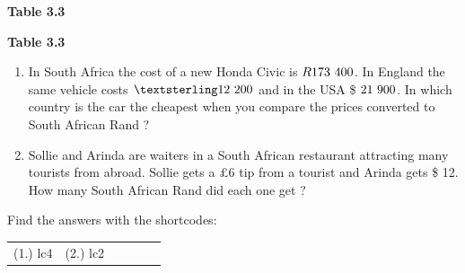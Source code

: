 \begin{enumerate}[noitemsep, label=\textbf{\arabic*}. ]
\begin{table}
\begin{center}
      \end{center}
    \begin{center}{\small\bfseries Table 3.3}\end{center}
    \begin{caption}{\small\bfseries Table 3.3}\end{caption}
\end{table}
    \par
  \label{m39335*id68888}\begin{enumerate}[noitemsep, label=\textbf{\alph*}. ] 
            \label{m39335*uid26}\item In South Africa the cost of a new Honda Civic is $R173\phantom{\rule{3.33333pt}{0ex}}400$. In England the same vehicle costs $£12\phantom{\rule{3.33333pt}{0ex}}200$ and in the USA \$ $21\phantom{\rule{3.33333pt}{0ex}}900$. In which country is the car the cheapest when you compare the prices converted to South African Rand ?
\label{m39335*uid27}\item Sollie and Arinda are waiters in a South African restaurant attracting many tourists from abroad. Sollie gets a $£6$ tip from a tourist and Arinda gets \$ 12.
How many South African Rand did each one get ?
\end{enumerate}
        \end{enumerate}
    \label{m39335*cid7}
\par {} Find the answers with the shortcodes:
 \par \begin{tabular}[h]{cccccc}
 (1.) lc4  &  (2.) lc2  & \end{tabular}
